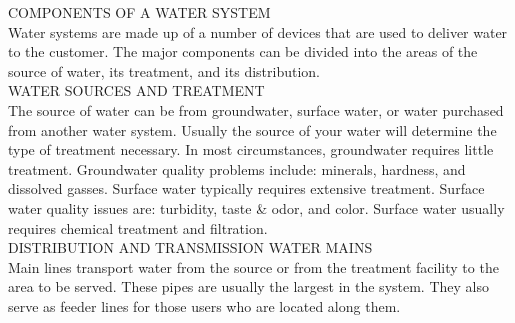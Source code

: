 \documentclass{article}
\begin{document}
COMPONENTS OF A WATER SYSTEM\\
Water systems are made up of a number of devices that are
used to deliver water to the customer. The major
components can be divided into the areas of the source of
water, its treatment, and its distribution.\\
WATER SOURCES AND TREATMENT\\
The source of water can be from groundwater, surface water, or water purchased from another water system. Usually the source of your water will determine the type of treatment necessary. In most circumstances, groundwater requires little treatment. Groundwater quality problems include: minerals, hardness, and dissolved gasses. Surface water typically requires extensive treatment. Surface water quality issues are: turbidity, taste \& odor, and color. Surface water usually requires chemical treatment and filtration.\\
DISTRIBUTION AND TRANSMISSION WATER MAINS\\
Main lines transport water from the source or from the treatment facility to the area to be served. These pipes are usually the largest in the system. They also serve as feeder lines for those users who are located along them.\\
\end{document}
